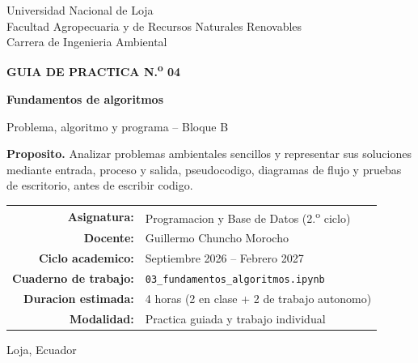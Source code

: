 \documentclass[11pt,a4paper]{article}
\newcommand{\code}[1]{\texttt{#1}}
\newcommand{\nbfile}{\code{03\_fundamentos\_algoritmos.ipynb}}
\begin{document}
\begin{titlepage}
\centering
\vspace*{0.8cm}
{\large Universidad Nacional de Loja\\[3pt]
Facultad Agropecuaria y de Recursos Naturales Renovables\\[3pt]
Carrera de Ingenieria Ambiental}\par
\vspace{1.5cm}
{\Large\color{moradoMedio}\bfseries GUIA DE PRACTICA N.\textsuperscript{o} 04}\par
\vspace{10pt}
{\Huge\bfseries\color{morado}Fundamentos de algoritmos}\par
\vspace{8pt}
{\Large\color{morado}Problema, algoritmo y programa -- Bloque B}\par
\vspace{1cm}
\begin{objetivo}
\textbf{Proposito.} Analizar problemas ambientales sencillos y representar sus soluciones mediante entrada, proceso y salida, pseudocodigo, diagramas de flujo y pruebas de escritorio, antes de escribir codigo.
\end{objetivo}
\vspace{1cm}
\begin{tabular}{rl}
\textbf{Asignatura:} & Programacion y Base de Datos (2.\textsuperscript{o} ciclo) \\
\textbf{Docente:} & Guillermo Chuncho Morocho \\
\textbf{Ciclo academico:} & Septiembre 2026 -- Febrero 2027 \\
\textbf{Cuaderno de trabajo:} & \nbfile{} \\
\textbf{Duracion estimada:} & 4 horas (2 en clase + 2 de trabajo autonomo) \\
\textbf{Modalidad:} & Practica guiada y trabajo individual \\
\end{tabular}
\vfill
{\small Loja, Ecuador}
\end{titlepage}

\tableofcontents
\newpage
\end{document}
